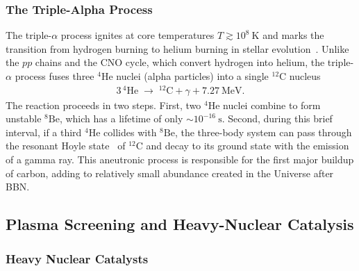 \documentclass[particles,article,accept,pdftex,moreauthors]{Definitions/mdpi}
\begin{document}

\subsubsection{The Triple-Alpha Process}\label{sec:TripleAlpha}

The triple-$\alpha$ process ignites at core temperatures $T \gtrsim 10^{8}~\mathrm{K}$ and marks the transition from hydrogen burning to helium burning in stellar evolution~\cite{Suno:2016fjb}. Unlike the $pp$ chains and the CNO cycle, which convert hydrogen into helium, the triple-$\alpha$ process fuses three ${}^{4}\mathrm{He}$ nuclei (alpha particles) into a single ${}^{12}\mathrm{C}$ nucleus
\begin{align}
3\,{}^{4}\mathrm{He} \;\longrightarrow\; {}^{12}\mathrm{C} + \gamma + 7.27~\mathrm{MeV}.
\end{align}
The reaction proceeds in two steps. First, two ${}^{4}\mathrm{He}$ nuclei combine to form unstable ${}^{8}\mathrm{Be}$, which has a lifetime of only ${\sim}10^{-16}~\mathrm{s}$. Second, during this brief interval, if a third ${}^{4}\mathrm{He}$ collides with ${}^{8}\mathrm{Be}$, the three-body system can pass through the resonant Hoyle state~\cite{Hoyle:1954zz,Chernykh:2007zz,Epelbaum:2011md} of ${}^{12}\mathrm{C}$ and decay to its ground state with the emission of a gamma ray. This aneutronic process is responsible for the first major buildup of carbon, adding to relatively small abundance created in the Universe after BBN.

\subsection{Plasma Screening and Heavy-Nuclear Catalysis}\label{ssec:PlasmaScreening}
\subsubsection{Heavy Nuclear Catalysts}\label{sssec:HeavyCatalyst}
\end{document}
